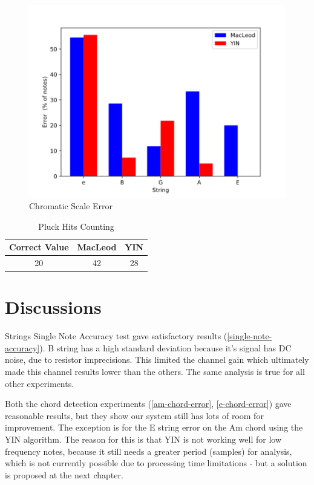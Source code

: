 \begin{figure}[!htpb]
  \centering
  \caption{Chromatic Scale Error}
  \label{chromatic-scale-error}
  \includegraphics[scale=0.85]{images/measurements/chromatic-scale-error}
\end{figure}

\begin{table}[htb]
  \begin{center}
    \ABNTEXreducedfont
    \caption[Pluck Hits Counting]{Pluck Hits Counting}
    \label{pluck-hits-counting}
    \begin{tabular}{c|c|c}
      \hline
      Correct Value & MacLeod & YIN \\
      \hline
      20 & 42 & 28 \\
      \hline
    \end{tabular}
  \end{center}
\end{table}

\section{Discussions}
Strings Single Note Accuracy test gave satisfactory results (\autoref{single-note-accuracy}). B string has a high
standard deviation because it's signal has DC noise, due to resistor
imprecisions. This limited the channel gain which ultimately made this
channel results lower than the others. The same analysis is true for
all other experiments.

Both the chord detection experiments (\autoref{am-chord-error}, \autoref{e-chord-error}) gave reasonable results, but they
show our system still has lots of room for improvement. The exception is for
the E string error on the Am chord using the YIN algorithm. The reason
for this is that YIN is not working well for low frequency notes, because
it still needs a greater period (samples) for analysis, which is not currently
possible due to processing time limitations - but a solution is proposed at
the next chapter.

